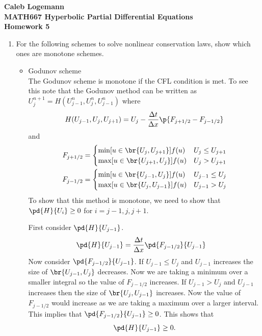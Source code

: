 \documentclass[11pt, oneside]{article}
\begin{document}
\noindent \textbf{\Large{Caleb Logemann \\
MATH667 Hyperbolic Partial Differential Equations \\
Homework 5
}}

%
\begin{enumerate}
  \item %
    For the following schemes to solve nonlinear conservation laws, show which
    ones are monotone schemes.
    \begin{itemize}
      \item Godunov scheme \hfill \\ %
        The Godunov scheme is monotone if the CFL condition is met.
        To see this note that the Godunov method can be written as
        $U^{n+1}_j = H(U^n_{j-1}, U^n_j, U^n_{j-1})$ where
        \[
          H(U_{j-1}, U_j, U_{j+1}) = U_j - \frac{\Delta t}{\Delta x}\p{F_{j+1/2} - F_{j-1/2}}
        \]
        and
        \begin{align*}
          F_{j+1/2} &=
          \begin{cases}
            \min[u \in \br{U_{j}, U_{j+1}}]{f(u)} & U_{j} \le U_{j+1} \\
            \max[u \in \br{U_{j+1}, U_{j}}]{f(u)} & U_{j} > U_{j+1}
          \end{cases} \\
          F_{j-1/2} &=
          \begin{cases}
            \min[u \in \br{U_{j-1}, U_{j}}]{f(u)} & U_{j-1} \le U_{j} \\
            \max[u \in \br{U_{j}, U_{j-1}}]{f(u)} & U_{j-1} > U_{j}
          \end{cases}
        \end{align*}
        To show that this method is monotone, we need to show that
        $\pd{H}{U_i} \ge 0$ for $i = j-1, j, j+1$.

        First consider $\pd{H}{U_{j-1}}$.
        \begin{align*}
          \pd{H}{U_{j-1}} &= \frac{\Delta t}{\Delta x} \pd{F_{j-1/2}}{U_{j-1}}
        \end{align*}
        Now consider $\pd{F_{j-1/2}}{U_{j-1}}$.
        If $U_{j-1} \le U_{j}$ and $U_{j-1}$ increases the size of
        $\br{U_{j-1}, U_j}$ decreases.
        Now we are taking a minimum over a smaller integral so the value of
        $F_{j-1/2}$ increases.
        If $U_{j-1} > U_{j}$ and $U_{j-1}$ increases then the size of
        $\br{U_j, U_{j-1}}$ increases.
        Now the value of $F_{j-1/2}$ would increase as we are taking a maximum
        over a larger interval.
        This implies that $\pd{F_{j-1/2}}{U_{j-1}} \ge 0$.
        This shows that
        \[
          \pd{H}{U_{j-1}} \ge 0.
        \]


\end{itemize}
\end{enumerate}
\end{document}
